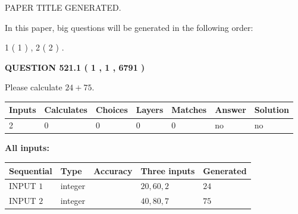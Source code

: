\documentclass[12pt]{article}
\begin{document}
   
\vspace{0.2in}
   
   
   
   
   
   
   
   
 \vspace{0.2in}
 
 
 
 
   
   
 PAPER TITLE GENERATED.
   
   
   
\vspace{0.2in}
   
In this paper, big questions will be generated in the following order: 
   
   
   1 ( 1 )
 ,
   2 ( 2 )
 .
  
\vspace{0.2in}
  
{\textbf{\Large{QUESTION
521.1 
 ( 1 , 1 , 6791 )
}}}
  
  
 
Please calculate $ %
24 +  %
75 $.
 
 
   
   
   
   
\noindent\begin{tabular}{|l|l|l|l|l|l|l|}
 \hline
Inputs & Calculates & Choices & Layers & Matches & Answer & Solution \\ \hline
 2  & 
 0  & 
 0
  & 
 0  & 
 0  & 
  no & 
  no 
  \\ \hline
 \end{tabular}
   
   
   
   
\noindent{}
   
   
   
   
\noindent\vspace{0.1in}\hspace{-0.08in} {\textbf{\Large{All inputs: }}}
   
   
  
  
\noindent\begin{tabular}{|l|l|l|l|l|}
\hline
 Sequential & Type & Accuracy & Three inputs & Generated \\ 
\hline
 
 
  INPUT $  1 $ & integer &  & $
 20
 , 
 60
 , 
 2
 $ & $ 24 $ 
 \\  \hline  
 
 
  INPUT $  2 $ & integer &  & $
 40
 , 
 80
 , 
 7
 $ & $ 75 $ 
 \\  \hline  
 \end{tabular}
   
\end{document}
